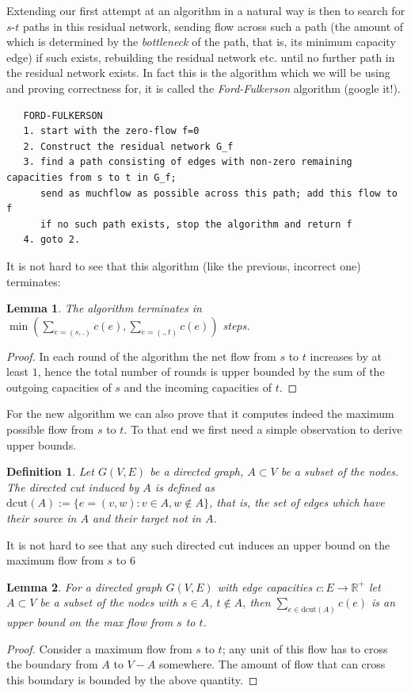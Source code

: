 \documentclass{article}
\newtheorem{definition}{Definition}
\newtheorem{lemma}{Lemma}
\begin{document}
Extending our first attempt at an algorithm in a natural way is then to search for $s$-$t$ paths in this residual network, sending flow across such a path (the amount of which is determined by the \emph{bottleneck} of the path, that is, its minimum capacity edge) if such exists, rebuilding the residual network etc. until no further path in the residual network exists. In fact this is the algorithm which we will be using and proving correctness for, it is called the \emph{Ford-Fulkerson} algorithm (google it!).	

\begin{verbatim}
   FORD-FULKERSON
   1. start with the zero-flow f=0
   2. Construct the residual network G_f
   3. find a path consisting of edges with non-zero remaining capacities from s to t in G_f;
      send as muchflow as possible across this path; add this flow to f
      if no such path exists, stop the algorithm and return f
   4. goto 2.
\end{verbatim}

It is not hard to see that this algorithm (like the previous, incorrect one) terminates:

\begin{lemma}
The algorithm terminates in $\min\left(\sum_{e=(s,.)} c(e), \sum_{e=(.,t)} c(e)\right)$ steps.
\end{lemma}
\begin{proof}
In each round of the algorithm the net flow from $s$ to $t$ increases by at least $1$, hence
the total number of rounds is upper bounded by the sum of the outgoing capacities of $s$ and
the incoming capacities of $t$.
\end{proof}

For the new algorithm we can also prove that it computes indeed the maximum possible flow from $s$ to $t$.
To that end we first need a simple observation to derive upper bounds.

\begin{definition}
Let $G(V,E)$ be a directed graph, $A\subset V$  be a subset of the nodes.
The \emph{directed cut} induced by $A$ is defined as $\mbox{dcut}(A):=\{e=(v,w): v\in A, w\notin A\}$, that is,
the set of edges which have their source in $A$ and their target not in $A$.
\end{definition}

It is not hard to see that any such directed cut induces an upper bound on the maximum flow from $s$ to $6$
\begin{lemma}
For a directed graph $G(V,E)$ with edge capacities $c:E\rightarrow \mathbb{R}^+$ let $A\subset V$ be a subset of the nodes with $s\in A$, $t\notin A$, then $\sum_{e\in\mbox{dcut}(A)} c(e)$ is an upper bound on the max flow from $s$ to $t$.
\end{lemma}
\begin{proof}
Consider a maximum flow from $s$ to $t$; any unit of this flow has to cross the boundary from $A$ to $V-A$ somewhere. The amount of flow that can cross this boundary is bounded by the above quantity.
\end{proof}
\end{document}
